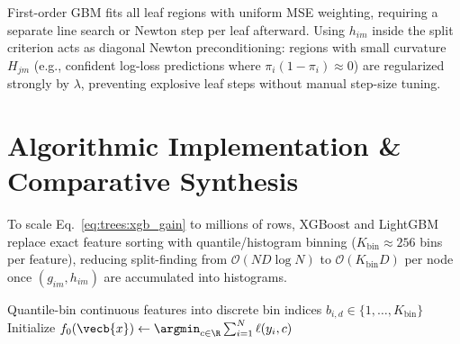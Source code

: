 \documentclass[../../../../master.tex]{subfiles}
\begin{document}
\begin{intuition}
First-order GBM fits all leaf regions with uniform MSE weighting, requiring a separate line search or Newton step per leaf afterward. Using $h_{im}$ inside the split criterion acts as diagonal Newton preconditioning: regions with small curvature $H_{jm}$ (e.g., confident log-loss predictions where $\pi_i(1-\pi_i) \approx 0$) are regularized strongly by $\lambda$, preventing explosive leaf steps without manual step-size tuning.
\end{intuition}

\section{Algorithmic Implementation \& Comparative Synthesis}

To scale Eq.~\eqref{eq:trees:xgb_gain} to millions of rows, XGBoost and LightGBM replace exact feature sorting with quantile/histogram binning ($K_{\mathrm{bin}} \approx 256$ bins per feature), reducing split-finding from $\mathcal{O}(N D \log N)$ to $\mathcal{O}(K_{\mathrm{bin}} D)$ per node once $(g_{im}, h_{im})$ are accumulated into histograms.

\begin{algorithm}[htbp]
\caption{Second-Order Histogram Gradient Boosted Decision Tree (XGBoost / LightGBM)}
\label{alg:trees:hist_gbdt}
\KwIn{Dataset $\mathcal{D} = \{(\vecb{x}_i, y_i)\}_{i=1}^{N}$, loss $\ell$, iterations $M$, shrinkage $\nu \in (0,1]$, depth $d_{\max}$, regularization $(\gamma, \lambda)$, subsample rates $(r_{\mathrm{row}}, r_{\mathrm{col}})$}
Quantile-bin continuous features into discrete bin indices $b_{i,d} \in \{1, \dots, K_{\mathrm{bin}}\}$\;
Initialize $f_0(\vecb{x}) \leftarrow \argmin_{c \in \R} \sum_{i=1}^{N} \ell(y_i, c)$\;
\;
\end{algorithm}
\end{document}
